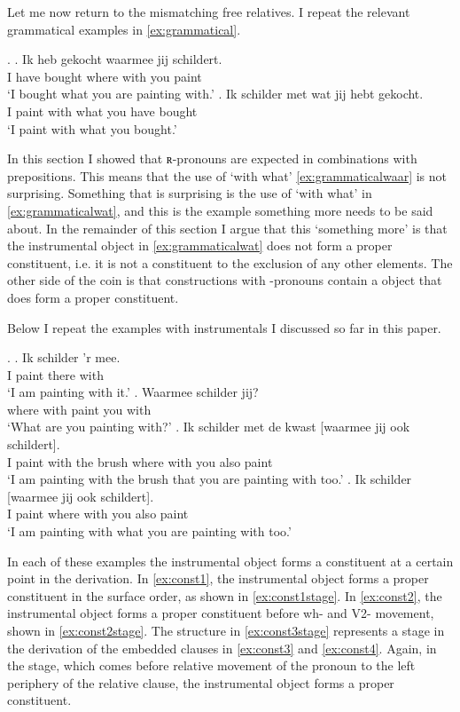 \documentclass[12pt]{article}
\begin{document}
Let me now return to the mismatching free relatives. I repeat the relevant grammatical examples in \ref{ex:grammatical}.

\ex.\label{ex:grammatical}
\ag. Ik heb gekocht waarmee jij schildert.\\
 I have bought {where with} you paint\\
 `I bought what you are painting with.'\label{ex:grammaticalwaar}
\bg. Ik schilder met wat jij hebt gekocht.\\
 I paint with what you have bought\\
 `I paint with what you bought.'\label{ex:grammaticalwat}

In this section I showed that ʀ-pronouns are expected in combinations with prepositions. This means that the use of  `with what' \ref{ex:grammaticalwaar} is not surprising. Something that is surprising is the use of  `with what' in \ref{ex:grammaticalwat}, and this is the example something more needs to be said about. In the remainder of this section I argue that this `something more' is that the instrumental object in \ref{ex:grammaticalwat} does not form a proper constituent, i.e. it is not a constituent to the exclusion of any other elements. The other side of the coin is that constructions with -pronouns contain a object that does form a proper constituent.

Below I repeat the examples with instrumentals I discussed so far in this paper.

\ex.
\ag. Ik schilder 'r mee.\\
 I paint there with\\
 `I am painting with it.'\label{ex:const1}
\bg. Waarmee schilder jij?\\
{where with} paint you with\\
 `What are you painting with?'\label{ex:const2}
\bg. Ik schilder met de kwast [waarmee jij ook schildert].\\
 I paint with the brush {where with} you also paint\\
 `I am painting with the brush that you are painting with too.'\label{ex:const3}
\bg. Ik schilder [waarmee jij ook schildert].\\
 I paint {where with} you also paint\\
 `I am painting with what you are painting with too.'\label{ex:const4}

In each of these examples the instrumental object forms a constituent at a certain point in the derivation. In \ref{ex:const1}, the instrumental object forms a proper constituent in the surface order, as shown in \ref{ex:const1stage}. In \ref{ex:const2}, the instrumental object forms a proper constituent before wh- and V2- movement, shown in \ref{ex:const2stage}.
The structure in \ref{ex:const3stage} represents a stage in the derivation of the embedded clauses in \ref{ex:const3} and \ref{ex:const4}. Again, in the stage, which comes before relative movement of the pronoun to the left periphery of the relative clause, the instrumental object forms a proper constituent.
\end{document}
